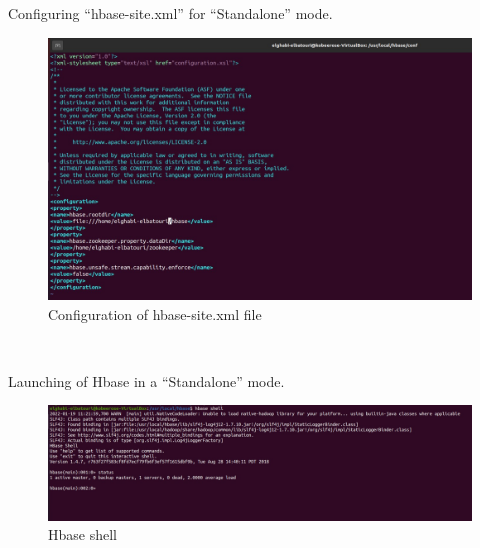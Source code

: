 \begin{spacing}{1.2}
\par Configuring “hbase-site.xml” for “Standalone” mode.
\\
\begin{figure}[!htb] 
\begin{center} 
\includegraphics[width=\linewidth]{Pictures/HBase/Configuring Hbase in Standalone & Pseudo-distributed mode/Configuring Hbase in Standalone mode/Configuration of hbase-site.xml file .jpg} 
\end{center} 
\caption{Configuration of hbase-site.xml file} 
\end{figure}  \FloatBarrier
\\

\par Launching of Hbase in a “Standalone” mode.
\\
\begin{figure}[!htb] 
\begin{center} 
\includegraphics[width=1\linewidth]{Pictures/HBase/Configuring Hbase in Standalone & Pseudo-distributed mode/Configuring Hbase in Standalone mode/Hbase shell} 
\end{center} 
\caption{Hbase shell} 
\end{figure}  \FloatBarrier
\\


\end{spacing}
